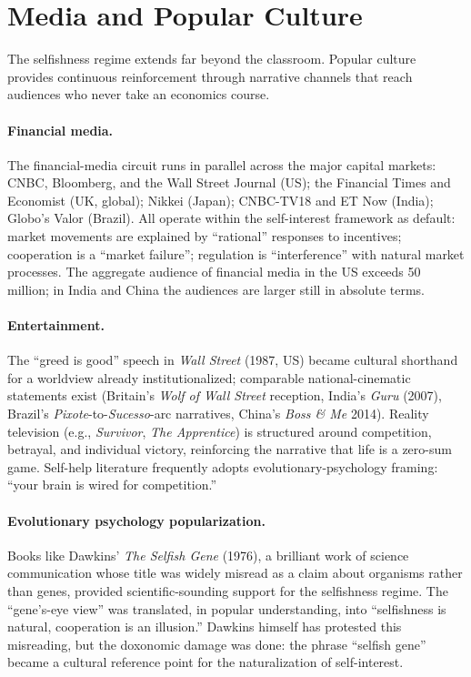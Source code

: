 \section{Media and Popular Culture}
\label{sec:ch21-media}

The selfishness regime extends far beyond the classroom.
Popular culture provides continuous reinforcement through narrative channels that reach audiences who never take an economics course.

\paragraph{Financial media.}
The financial-media circuit runs in parallel across the major capital markets: CNBC, Bloomberg, and the Wall Street Journal (US); the Financial Times and Economist (UK, global); Nikkei (Japan); CNBC-TV18 and ET Now (India); Globo's Valor (Brazil).
All operate within the self-interest framework as default: market movements are explained by ``rational'' responses to incentives; cooperation is a ``market failure''; regulation is ``interference'' with natural market processes.
The aggregate audience of financial media in the US exceeds 50 million; in India and China the audiences are larger still in absolute terms.

\paragraph{Entertainment.}
The ``greed is good'' speech in \emph{Wall Street} (1987, US) became cultural shorthand for a worldview already institutionalized; comparable national-cinematic statements exist (Britain's \emph{Wolf of Wall Street} reception, India's \emph{Guru} (2007), Brazil's \emph{Pixote}-to-\emph{Sucesso}-arc narratives, China's \emph{Boss \& Me} 2014).
Reality television (e.g., \emph{Survivor}, \emph{The Apprentice}) is structured around competition, betrayal, and individual victory, reinforcing the narrative that life is a zero-sum game.
Self-help literature frequently adopts evolutionary-psychology framing: ``your brain is wired for competition.''

\paragraph{Evolutionary psychology popularization.}
Books like Dawkins' \emph{The Selfish Gene} (1976), a brilliant work of science communication whose title was widely misread as a claim about organisms rather than genes, provided scientific-sounding support for the selfishness regime.
The ``gene's-eye view'' was translated, in popular understanding, into ``selfishness is natural, cooperation is an illusion.''
Dawkins himself has protested this misreading, but the doxonomic damage was done: the phrase ``selfish gene'' became a cultural reference point for the naturalization of self-interest.

